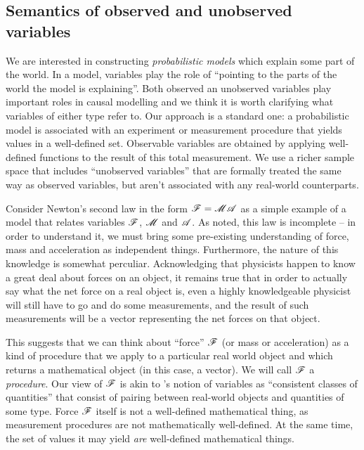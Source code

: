 \subsection{Semantics of observed and unobserved variables}\label{sec:variables}

We are interested in constructing \emph{probabilistic models} which explain some part of the world. In a model, variables play the role of ``pointing to the parts of the world the model is explaining''. Both observed an unobserved variables play important roles in causal modelling and we think it is worth clarifying what variables of either type refer to. Our approach is a standard one: a probabilistic model is associated with an experiment or measurement procedure that yields values in a well-defined set. Observable variables are obtained by applying well-defined functions to the result of this total measurement. We use a richer sample space that includes ``unobserved variables'' that are formally treated the same way as observed variables, but aren't associated with any real-world counterparts.

Consider Newton's second law in the form $\mathscr{F}=\mathscr{MA}$ as a simple example of a model that relates variables $\mathscr{F}$, $\mathscr{M}$ and $\mathscr{A}$. As \citet{feynman_feynman_1979} noted, this law is incomplete -- in order to understand it, we must bring some pre-existing understanding of force, mass and acceleration as independent things. Furthermore, the nature of this knowledge is somewhat perculiar. Acknowledging that physicists happen to know a great deal about forces on an object, it remains true that in order to actually say what the net force on a real object is, even a highly knowledgeable physicist will still have to go and do some measurements, and the result of such measurements will be a vector representing the net forces on that object.

This suggests that we can think about ``force'' $\mathscr{F}$ (or mass or acceleration) as a kind of procedure that we apply to a particular real world object and which returns a mathematical object (in this case, a vector). We will call $\mathscr{F}$ a \emph{procedure}. Our view of $\mathscr{F}$ is akin to \citet{menger_random_2003}'s notion of variables as ``consistent classes of quantities'' that consist of pairing between real-world objects and quantities of some type. Force $\mathscr{F}$ itself is not a well-defined mathematical thing, as measurement procedures are not mathematically well-defined. At the same time, the set of values it may yield \emph{are} well-defined mathematical things.

